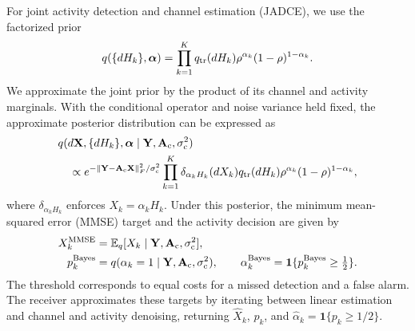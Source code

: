 For joint activity detection and channel estimation (JADCE), we use
the factorized prior
\begin{equation}
 q(\{dH_k\},\bm\alpha)=
 \prod_{k=1}^{K}q_{\rm tr}(dH_k)
 \rho^{\alpha_k}(1-\rho)^{1-\alpha_k}.
 \label{eq:working-prior}
\end{equation}
We approximate the joint prior by the product of its channel
and activity marginals. With the conditional operator and noise variance
held fixed, the approximate posterior distribution can be expressed as
\begin{equation}
 \begin{aligned}
 &q(d\mathbf X,\{dH_k\},\bm\alpha\mid
 \mathbf Y,\mathbf A_{\rm c},\sigma_{\rm c}^2)\\
 &\quad\propto
 e^{-\left\lVert\mathbf Y-\mathbf A_{\rm c}\mathbf X\right\rVert_F^2/\sigma_{\rm c}^2}
 \prod_{k=1}^{K}
 \delta_{\alpha_kH_k}(dX_k)q_{\rm tr}(dH_k)
 \rho^{\alpha_k}(1-\rho)^{1-\alpha_k},
 \end{aligned}
 \label{eq:working-posterior}
\end{equation}
where $\delta_{\alpha_kH_k}$ enforces $X_k=\alpha_kH_k$.
Under this posterior, the minimum mean-squared error (MMSE) target
and the activity decision are given by
\begin{equation}
 \begin{aligned}
 X_k^{\rm MMSE}&=\mathbb{E}_q[X_k\mid\mathbf Y,\mathbf A_{\rm c},\sigma_{\rm c}^2],\\
 p_k^{\rm Bayes}&=q(\alpha_k=1\mid\mathbf Y,\mathbf A_{\rm c},\sigma_{\rm c}^2),\qquad
 \alpha_k^{\rm Bayes}=\mathbf1\{p_k^{\rm Bayes}\geq\tfrac12\}.
 \end{aligned}
 \label{eq:targets}
\end{equation}
The threshold corresponds to equal costs for a missed detection and a
false alarm. The receiver approximates these targets by iterating between
linear estimation and channel and activity denoising, returning
$\widehat X_k$, $p_k$, and $\widehat\alpha_k=\mathbf1\{p_k\geq1/2\}$.
